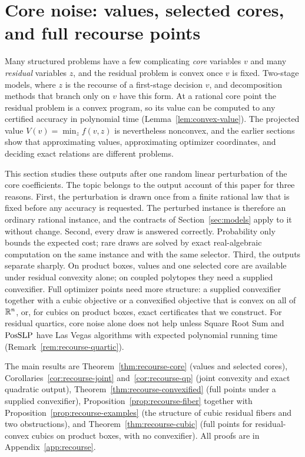 \section{Core noise: values, selected cores, and full recourse points}
\label{sec:recourse}

Many structured problems have a few complicating \emph{core} variables
$v$ and many \emph{residual} variables $z$, and the residual problem is
convex once $v$ is fixed. Two-stage models, where $z$ is the recourse
of a first-stage decision $v$, and decomposition methods that branch
only on $v$ have this form. At a rational core point the residual
problem is a convex program, so its value can be computed to any
certified accuracy in polynomial time (Lemma~\ref{lem:convex-value}).
The projected value $V(v)=\min_zf(v,z)$ is nevertheless nonconvex, and
the earlier sections show that approximating values, approximating
optimizer coordinates, and deciding exact relations are different
problems.

This section studies these outputs after one random linear
perturbation of the core coefficients. The topic belongs to the output
account of this paper for three reasons. First, the perturbation is
drawn once from a finite rational law that is fixed before any accuracy
is requested. The perturbed instance is therefore an ordinary rational
instance, and the contracts of Section~\ref{sec:models} apply to it
without change. Second, every draw is answered correctly. Probability
only bounds the expected cost; rare draws are solved by exact
real-algebraic computation on the same instance and with the same
selector. Third, the outputs separate sharply. On product boxes, values
and one selected core are available under residual convexity alone; on
coupled polytopes they need a supplied convexifier. Full optimizer
points need more structure: a supplied convexifier together with a
cubic objective or a convexified objective that is convex on all of
$\mathbb R^n$, or, for cubics on product boxes, exact certificates that we
construct. For residual quartics, core noise alone
does not help unless Square Root Sum and $\mathrm{PosSLP}$ have Las Vegas
algorithms with expected polynomial running time
(Remark~\ref{rem:recourse-quartic}).

The main results are Theorem~\ref{thm:recourse-core} (values and
selected cores), Corollaries~\ref{cor:recourse-joint}
and~\ref{cor:recourse-qp} (joint convexity and exact quadratic output),
Theorem~\ref{thm:recourse-convexified} (full points under a supplied
convexifier), Proposition~\ref{prop:recourse-fiber} together with
Proposition~\ref{prop:recourse-examples} (the structure of cubic
residual fibers and two obstructions), and
Theorem~\ref{thm:recourse-cubic} (full points for residual-convex cubics
on product boxes, with no convexifier). All proofs are in
Appendix~\ref{app:recourse}.


